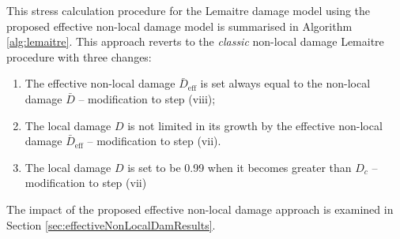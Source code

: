 \documentclass[sn-mathphys,Numbered]{sn-jnl}%
\begin{document}




This stress calculation procedure for the Lemaitre damage model using the proposed effective non-local damage model is summarised in Algorithm \ref{alg:lemaitre}.
This approach reverts to the \emph{classic} non-local damage Lemaitre procedure with three changes:
\begin{enumerate}[label=(\alph*)]
	\item The effective non-local damage $\bar{D}_\text{eff}$ is set always equal to the non-local damage $\bar{D}$ -- modification to step (viii);
	\item The local damage $D$ is not limited in its growth by the effective non-local damage $\bar{D}_\text{eff}$ -- modification to step (vii).
	\item The local damage $D$ is set to be 0.99 when it becomes greater than $D_c$ -- modification to step (vii)
\end{enumerate}
The impact of the proposed effective non-local damage approach is examined in Section \ref{sec:effectiveNonLocalDamResults}.
\end{document}
